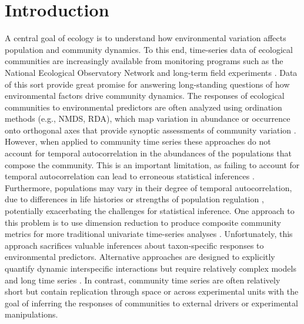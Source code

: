 \section*{Introduction}

A central goal of ecology is to understand how environmental variation affects
population and community dynamics.
To this end, 
time-series data of ecological communities are increasingly available from monitoring programs such as the
National Ecological Observatory Network \citep{Keller2008} and
long-term field experiments \citep[e.g.,][]{Fraser2013, Cowles2018}.
Data of this sort provide great promise for answering long-standing questions of
how environmental factors drive community dynamics.
The responses of ecological communities to environmental predictors are often analyzed
using ordination methods (e.g., NMDS, RDA), which map variation in abundance or
occurrence onto orthogonal axes that provide synoptic assessments of community
variation \citep{Mcgarigal2013}.
However, when applied to community time series these approaches do not account for temporal
autocorrelation in the abundances of the populations that compose the community.
This is an important limitation, as failing to account for temporal autocorrelation
can lead to erroneous statistical inferences \citep{Ives2006}.
Furthermore, populations may vary in their degree of temporal autocorrelation,
due to differences in life histories or strengths of population regulation \citep{Ziebarth2010},
potentially exacerbating the challenges for statistical inference.
One approach to this problem is to use dimension reduction 
to produce composite community metrics for more traditional univariate time-series analyses \citep{Simpson2009}.
Unfortunately, this approach sacrifices valuable inferences about taxon-specific responses 
to environmental predictors.
Alternative approaches are designed to explicitly quantify dynamic interspecific interactions
but require relatively complex models and long time series \citep{Ives2003, Hampton2013}.
In contrast, community time series are often relatively short but contain
replication through space or across experimental units with the goal of
inferring the responses of communities to external drivers or experimental manipulations.


